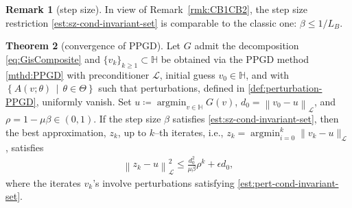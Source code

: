 \documentclass{amsart}
\DeclareMathOperator*{\argmin}{argmin}
\newcommand{\normL}[1]{{\| #1 \|_{\mathcal{L}}}}
\newcommand{\LL}{\mathcal{L}}
\newcommand{\norm}[2]{\left\| #1 \right\| _{#2}}
\newcommand{\HH}{\mathbb{H}}
\newcommand{\s}{{\beta}}	%
\theoremstyle{definition}
\newtheorem{thm}{Theorem}[section]
\newtheorem{rmk}[thm]{Remark}
\begin{document}
\begin{rmk}[step size]
	In view of Remark~\ref{rmk:CB1CB2}, the step size restriction \eqref{est:sz-cond-invariant-set} is comparable to the classic one: $\s \le 1/L_B$.
\end{rmk}


\begin{thm}[convergence of PPGD]\label{thm:PPGD-conv-abs}
  Let $G$ admit the decomposition \eqref{eq:GisComposite} and $\{v_k\}_{k\ge1} \subset \HH$ be obtained via the PPGD method \eqref{mthd:PPGD} with preconditioner $\LL$, initial guess $v_0\in \HH$, and with $\left\{A(v;\theta) \, \middle| \, \theta\in \Theta \right\}$ such that perturbations, defined in \eqref{def:perturbation-PPGD}, uniformly vanish.
	Set $u \coloneqq \argmin_{v\in\HH}G(v)$, $d_0=\norm{v_0 - u}{\LL}$, and $\rho=1-\mu\s \in (0,1)$.
  If the step size $\s$ satisfies \eqref{est:sz-cond-invariant-set}, then the best approximation, $z_k$, up to $k$--th iterates, i.e., $z_k=\argmin_{i=0}^{k} \normL{v_k-u}$, satisfies
	\begin{align}\label{est:PPGD-err-conv}
		\norm{z_k - u}{\LL}^2  \le \frac{d_{0}^2}{\mu\s} \rho^{k}  +  \epsilon d_0,
	\end{align}
	where the iterates $v_k$'s involve perturbations satisfying \eqref{est:pert-cond-invariant-set}. 
\end{thm}
\end{document}
